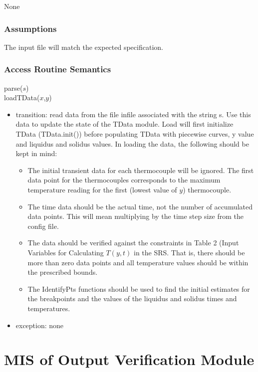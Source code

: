 \documentclass[12pt, titlepage]{article}
\begin{document}
None

\subsubsection{Assumptions}

The input file will match the expected specification.

\subsubsection{Access Routine Semantics}

\noindent parse($s$)\\
\noindent loadTData($x$,$y$)
\begin{itemize}
\item transition: read data from the file infile associated with the string s.
  Use this data to update the state of the TData module.  Load will first
  initialize TData (TData.init()) before populating TData with piecewise curves,
  y value and liquidus and solidus values.  In loading the data, the following
  should be kept in mind:
\begin{itemize}
\item  The initial transient data for each thermocouple will be ignored.  The first
  data point for the thermocouples corresponds to the maximum temperature
  reading for the first (lowest value of $y$) thermocouple.
\item The time data should be the actual time, not the number of accumulated
  data points.  This will mean multiplying by the time step size from the config
  file.
\item The data should be verified against the constraints in Table 2 (Input
  Variables for Calculating $T(y, t)$ in the SRS.  That is, there should be more
  than zero data points and all temperature values should be within the
  prescribed bounds.
\item The IdentifyPts functions should be used to find the initial estimates for
  the breakpoints and the values of the liquidus and solidus times and
  temperatures.
\end{itemize}
\item exception: none
\end{itemize}

\newpage

\section{MIS of Output Verification Module} \label{VerifyOutput}
\end{document}

